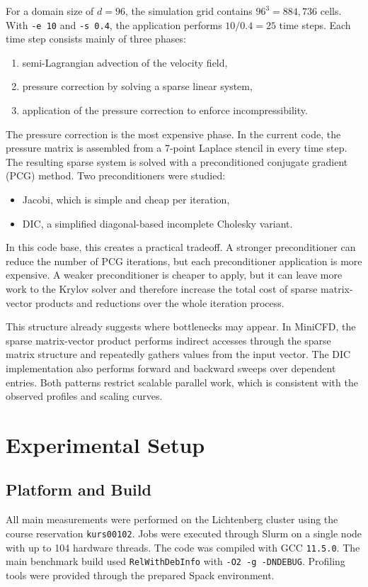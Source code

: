 \documentclass[10pt,firstlineindent,nopartpage,article,accentcolor=tud1b]{tudreport}
\begin{document}
For a domain size of $d=96$, the simulation grid contains
$96^3=884{,}736$ cells. With \texttt{-e 10} and \texttt{-s 0.4}, the
application performs $10 / 0.4 = 25$ time steps. Each time step consists
mainly of three phases:
\begin{enumerate}[leftmargin=*]
\item semi-Lagrangian advection of the velocity field,
\item pressure correction by solving a sparse linear system,
\item application of the pressure correction to enforce incompressibility.
\end{enumerate}

The pressure correction is the most expensive phase. In the current code, the
pressure matrix is assembled from a 7-point Laplace stencil in every time step.
The resulting sparse system is solved with a preconditioned conjugate gradient
(PCG) method. Two preconditioners were studied:
\begin{itemize}[leftmargin=*]
\item Jacobi, which is simple and cheap per iteration,
\item DIC, a simplified diagonal-based incomplete Cholesky variant.
\end{itemize}

In this code base, this creates a practical tradeoff. A stronger preconditioner
can reduce the number of PCG iterations, but each preconditioner application is
more expensive. A weaker preconditioner is cheaper to apply, but it can leave
more work to the Krylov solver and therefore increase the total cost of sparse
matrix-vector products and reductions over the whole iteration process.

This structure already suggests where bottlenecks may appear. In MiniCFD, the
sparse matrix-vector product performs indirect accesses through the sparse
matrix structure and repeatedly gathers values from the input vector. The DIC
implementation also performs forward and backward sweeps over dependent entries.
Both patterns restrict scalable parallel work, which is consistent with the
observed profiles and scaling curves.

\section{Experimental Setup}
\subsection{Platform and Build}
All main measurements were performed on the Lichtenberg cluster using the
course reservation \texttt{kurs00102}. Jobs were executed through Slurm on a
single node with up to 104 hardware threads. The code was compiled with GCC
\texttt{11.5.0}. The main benchmark build used \texttt{RelWithDebInfo} with
\texttt{-O2 -g -DNDEBUG}. Profiling tools were provided through the prepared
Spack environment.
\end{document}
